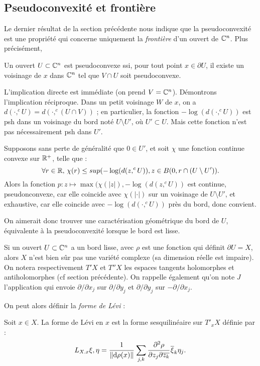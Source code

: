 \subsection{Pseudoconvexité et frontière}
Le dernier résultat de la section précédente nous indique que la pseudoconvexité est une propriété qui concerne uniquement la \emph{frontière} d'un ouvert de $\mathbb{C}^n$. Plus précisément,

\begin{prop}
	Un ouvert $U \subset \mathbb{C}^n$ est pseudoconvexe ssi, pour tout point $x\in \partial U$, il existe un voisinage de $x$ dans $\mathbb{C}^n$ tel que $V \cap U$ soit pseudoconvexe.
\end{prop}
\begin{preuve}
	L'implication directe est immédiate (on prend $V=\mathbb{C}^n$). Démontrons l'implication réciproque. Dans un petit voisinage $W$ de $x$, on a $d(\cdot,^cU)=d(\cdot,^c(U\cap V))$ ; en particulier, la fonction $-\log(d(\cdot,^cU))$ est psh dans un voisinage du bord noté $U \setminus U'$, où $U' \subset U$. Mais cette fonction n'est pas nécessairement psh dans $U'$.
	
	Supposons sans perte de généralité que $0 \in U'$, et soit $\chi$ une fonction continue convexe sur $\mathbb{R}^+$, telle que :
	\begin{equation*}
		\forall r \in \mathbb{R},\,\chi(r)\leq sup(-\log(d(z,^cU)), z\in B(0,r \cap (U \setminus U')).
	\end{equation*}
	Alors la fonction $p:z \mapsto \max(\chi(|z|),-\log(d(z,^cU))$ est continue, pseudonconvexe, car elle coincide avec $\chi(|\cdot|)$ sur un voisinage de $U\setminus U'$, et exhaustive, car elle coincide avec $-\log(d(\cdot, ^cU))$ près du bord, donc convient.
\end{preuve}

On aimerait donc trouver une caractérisation géométrique du bord de $U$, équivalente à la pseudoconvexité lorsque le bord est lisse.

Si un ouvert $U \subset \mathbb{C}^n$ a un bord lisse, avec $\rho$ est une fonction qui définit $\partial U=X$, alors $X$ n'est bien sûr pas une variété complexe (sa dimension réelle est impaire). On notera respectivement $T'X$ et $T''X$ les espaces tangents holomorphes et antiholomorphes (cf section précédente). On rappelle également qu'on note $J$ l'application qui envoie $\partial/\partial x_j$ sur $\partial/\partial y_j$ et $\partial/\partial y_j$ sur $-\partial/\partial x_j$.

On peut alors définir la \emph{forme de Lévi} :
\begin{defn}
	Soit $x\in X$. La forme de Lévi en $x$ est la forme sesquilinéaire sur $T'_xX$ définie par :
	\begin{equation*}
		L_{X.x}{\xi,\eta}=\cfrac{1}{\|\mathrm{d} \rho(x)\|}\,\sum_{j,k}\cfrac{\partial^2\rho}{\partial z_j\partial \overline{z_k}}\,\overline{\xi}_k\eta_j.
	\end{equation*}
\end{defn}

